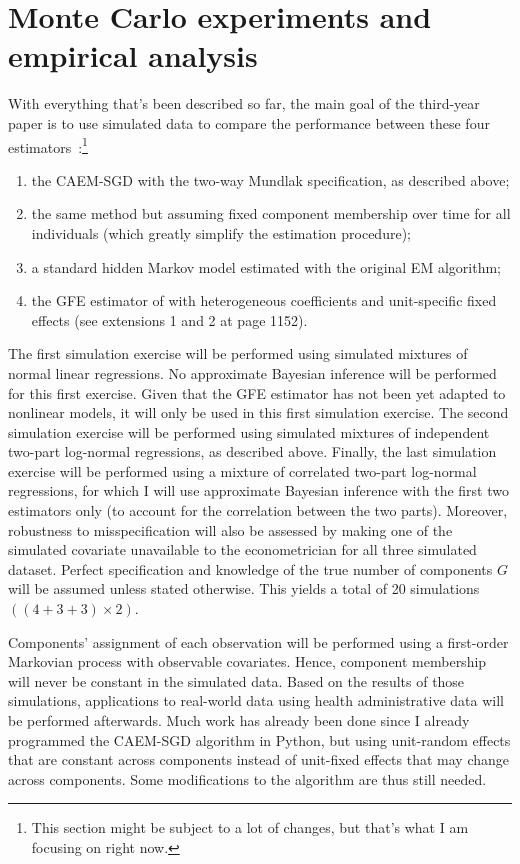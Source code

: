\documentclass[11pt,letter]{article}
\begin{document}
\section{Monte Carlo experiments and empirical analysis}
With everything that's been described so far, the main goal of the third-year paper is to use simulated data to compare the performance between these four estimators~:\footnote{This section might be subject to a lot of changes, but that's what I am focusing on right now.}
\begin{enumerate}
	\item the CAEM-SGD with the two-way Mundlak specification, as described above;
	\item the same method but assuming fixed component membership over time for all individuals (which greatly simplify the estimation procedure);
	\item a standard hidden Markov model estimated with the original EM algorithm;
	\item the GFE estimator of \cite{bonhomme_grouped_2015} with heterogeneous coefficients and unit-specific fixed effects (see extensions 1 and 2 at page 1152).
\end{enumerate}
The first simulation exercise will be performed using simulated mixtures of normal linear regressions. No approximate Bayesian inference will be performed for this first exercise. Given that the GFE estimator has not been yet adapted to nonlinear models, it will only be used in this first simulation exercise. The second simulation exercise will be performed using simulated mixtures of independent two-part log-normal regressions, as described above. Finally, the last simulation exercise will be performed using a mixture of correlated two-part log-normal regressions, for which I will use approximate Bayesian inference with the first two estimators only (to account for the correlation between the two parts). Moreover, robustness to misspecification will also be assessed by making one of the simulated covariate unavailable to the econometrician for all three simulated dataset. Perfect specification and knowledge of the true number of components $G$ will be assumed unless stated otherwise. This yields a total of 20 simulations $((4+3+3)\times 2)$.
\par
Components' assignment of each observation will be performed using a first-order Markovian process with observable covariates. Hence, component membership will never be constant in the simulated data. Based on the results of those simulations, applications to real-world data using health administrative data will be performed afterwards. Much work has already been done since I already programmed the CAEM-SGD algorithm in Python, but using unit-random effects that are constant across components instead of unit-fixed effects that may change across components. Some modifications to the algorithm are thus still needed.
\pagebreak


\pagebreak
\appendix
\end{document}
